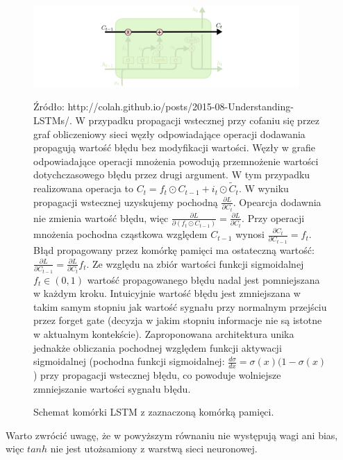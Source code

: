 \documentclass[oneside, mag]{mgr}
\begin{document}
\begin{figure}
\centering
	\includegraphics[width=0.90\textwidth]{img/LSTM3-C-line.png}
	\caption{Schemat komórki LSTM z zaznaczoną komórką pamięci.} Źródło: http://colah.github.io/posts/2015-08-Understanding-LSTMs/. W przypadku propagacji wstecznej przy cofaniu się przez graf obliczeniowy sieci węzły odpowiadające operacji dodawania propagują wartość błędu bez modyfikacji wartości. Węzły w grafie odpowiadające operacji mnożenia powodują przemnożenie wartości dotychczasowego błędu przez drugi argument. W tym przypadku realizowana operacja to $C_t = f_t \odot C_{t-1} + i_t \odot \tilde{C}_t$. W wyniku propagacji wstecznej uzyskujemy pochodną $\frac{\partial L}{\partial C_t}$. Opearcja dodawnia nie zmienia wartość błędu, więc $\frac{\partial L}{\partial (f_t \odot C_{t-1})} = \frac{\partial L}{\partial C_t}$. Przy operacji mnożenia pochodna cząstkowa względem $C_{t-1}$ wynosi $\frac{\partial C_t}{\partial C_{t-1}} = f_t$. Błąd propagowany przez komórkę pamięci ma ostateczną wartość: $\frac{\partial L}{\partial C_{t-1}} = \frac{\partial L}{\partial C_t} f_t$. Ze względu na zbiór wartości funkcji sigmoidalnej $f_t \in (0, 1)$ wartość propagowanego błędu nadal jest pomniejszana w każdym kroku. Intuicyjnie wartość błędu jest zmniejszana w takim samym stopniu jak wartość sygnału przy normalnym przejściu przez forget gate (decyzja w jakim stopniu informacje nie są istotne w aktualnym kontekście). Zaproponowana architektura unika jednakże obliczania pochodnej względem funkcji aktywacji sigmoidalnej (pochodna funkcji sigmoidalnej: $\frac{d \sigma}{dx} = \sigma (x)(1 - \sigma (x)$) przy propagacji wstecznej błędu, co powoduje wolniejsze zmniejszanie wartości sygnału błędu. 
	\label{fig:lstm-mem-cell}
\end{figure}

Warto zwrócić uwagę, że w powyższym równaniu nie występują wagi ani bias, więc $tanh$ nie jest utożsamiony z warstwą sieci neuronowej.
\end{document}
